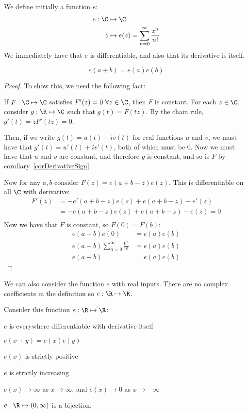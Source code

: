 \documentclass[../Main.tex]{subfiles}
\begin{document}
We define initially a function $e$:
\begin{align*}
    e : \C &\mapsto \C \\
    z &\mapsto e(z) = \sum_{n = 0}^\infty \frac{z^n}{n!}
\end{align*}
We immediately have that $e$ is differentiable, and also that its derivative is itself.
\begin{proposition}
    \begin{equation*}
        e(a + b) = e(a) e(b)
    \end{equation*}
    \label{propExpAdditivity}
\end{proposition}
\begin{proof}
    To show this, we need the following fact:\par
    \begin{subproof}{If $F : \C \mapsto \C$ satisfies $F'(z) = 0~\forall z \in \C$, then $F$ is constant.}
        For each $z \in \C$, consider $g : \R \mapsto \C$ such that $g(t) = F(tz)$. By the chain rule, $g'(t) = zF'(tz) = 0$.\par
        Then, if we write $g(t) = u(t) + iv(t)$ for real functions $u$ and $v$, we must have that $g'(t) = u'(t) + iv'(t)$, both of which must be 0. Now we must have that $u$ and $v$ are constant, and therefore $g$ is constant, and so is $F$ by corollary~\ref{corDerivativeSign}.
    \end{subproof}
    Now for any $a, b$ consider $F(z) = e(a + b - z) e(z)$. This is differentiable on all $\C$ with derivative:
    \begin{align*}
        F'(z) &= -e'(a + b - z) e(z) + e(a + b - z) - e'(z) \\
        &= -e(a + b - z) e(z) + e(a + b - z) - e(z) = 0\\
    \end{align*}
    Now we have that $F$ is constant, so $F(0) = F(b)$:
    \begin{align*}
        e(a + b) e(0) &= e(a) e(b) \\
        e(a + b) \sum_{n = 0}^\infty \frac{0^n}{n!} &= e(a) e(b) \\
        e(a + b) &= e(a) e(b)
    \end{align*}
\end{proof}
We can also consider the function $e$ with real inputs. There are no complex coefficients in the definition so $e : \R \mapsto \R$.
\begin{propositions}{
        Consider this function $e : \R \mapsto \R$:
        \label{propsExpRealProps}
    }   
    \item $e$ is everywhere differentiable with derivative itself \label{propExpDifferentiableReal}
    \item $e(x + y) = e(x) e(y)$ \label{propExpAdditivityReal}
    \item $e(x)$ is strictly positive \label{propExpPositive}
    \item $e$ is strictly increasing \label{propExpIncreasing}
    \item $e(x) \to \infty$ as $x \to \infty$, and $e(x) \to 0$ as $x \to -\infty$ \label{propExpLimits}
    \item $e : \R \mapsto (0, \infty)$ is a bijection. \label{propExpBijection}
\end{propositions}
\end{document}
